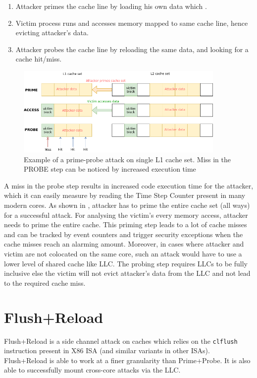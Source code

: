 \begin{enumerate}
\item Attacker primes the cache line by loading his own data which .
\item Victim process runs and accesses memory mapped to same cache line, hence evicting attacker's data.
\item Attacker probes the cache line by reloading the same data, and looking for a cache hit/miss.
\end{enumerate}

\begin{figure}[h]
\includegraphics[width=0.9\textwidth]{prime_probe}
\caption[Prime Probe attack]{Example of a prime-probe attack on single L1 cache set. Miss in the PROBE step can be noticed by increased execution time}
\label{fig:pp}
\end{figure}

A miss in the probe step results in increased code execution time for the attacker,
which it can easily measure by reading the Time Step Counter present in many modern cores.
As shown in , attacker has to prime the entire cache set (all ways) for a successful attack.
For analysing the victim's every memory access, attacker needs to prime the entire cache.
This priming step leads to a lot of cache misses and can be tracked by event counters and
trigger security exceptions when the cache misses reach an alarming amount.
Moreover, in cases where attacker and victim are not colocated on the same core,
such an attack would have to use a lower level of shared cache like LLC. The probing step
requires LLCs to be fully inclusive else the victim will not evict attacker's data from the LLC
and not lead to the required cache miss.

\section{Flush+Reload}

Flush+Reload is a side channel attack on caches which relies on the \texttt{clflush} instruction present in
X86 ISA (and similar variants in other ISAs). Flush+Reload is able to work at a finer granularity than Prime+Probe.
It is also able to successfully mount cross-core attacks via the LLC.

